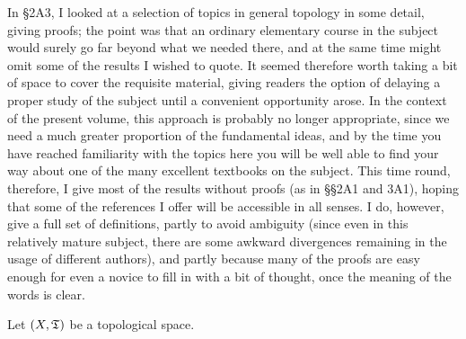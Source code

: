 
\def\Bourbaki{{\smc Bourbaki 66}}
\def\Dugundji{{\smc Dugundji 66}}
\def\Engelking{{\smc Engelking 89}}
\def\Gaal{{\smc Gaal 64}}
\def\James{{\smc James 87}}
\def\Schubert{{\smc Schubert 68}}

\def\chaptername{Appendix}
\def\sectionname{General topology}


In \S2A3, I looked at a selection of topics in general topology in some
detail, giving proofs;  the point was that an ordinary elementary course
in the subject would surely go far beyond what we needed there, and at
the same time might omit some of the results I wished to quote.
It seemed therefore worth taking a bit of space to cover the requisite
material, giving readers the option of delaying a proper study of the
subject until a convenient opportunity arose.   In the context of the
present volume, this approach is probably no longer appropriate, since
we need a much greater proportion of the fundamental ideas, and by the
time you have reached familiarity with the topics here you will be
well able to find your way about one of the many excellent textbooks on
the subject.   This time round, therefore, I give most of the results
without proofs (as in \S\S2A1 and 3A1), hoping that some of the
references I
offer will be accessible in all senses.   I do, however, give a full set
of definitions, partly to avoid ambiguity (since even in this relatively
mature subject, there are some awkward divergences remaining in the
usage of different authors), and partly because many of the proofs are
easy enough for even a novice to fill in with a bit of thought, once the
meaning of the words is clear.   

 Let $(X,\frak T)$ be a topological space.

